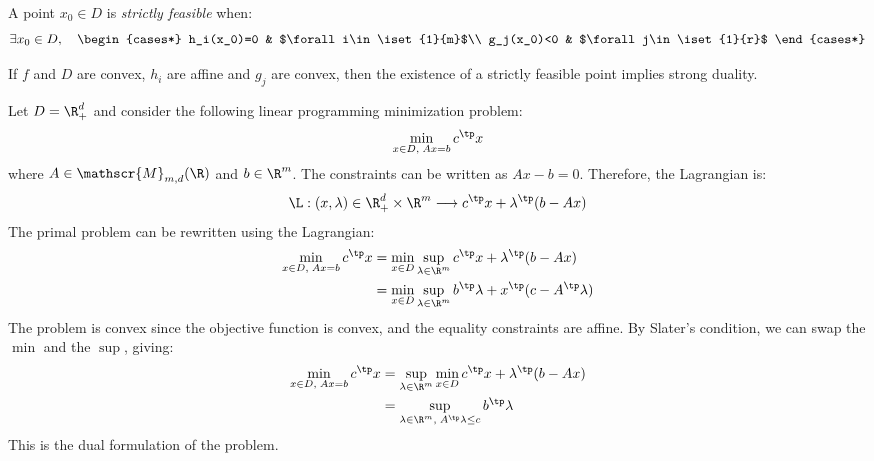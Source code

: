 \documentclass{../cs-classes/cs-classes}
\begin{document}
\begin{definition}
    A point $x_0\in D$ is \emph{strictly feasible} when:
    \begin{equation*}
        \exists x_0\in D, \quad \begin{cases*}
            h_i(x_0)=0 & $\forall i\in\iset{1}{m}$\\
            g_j(x_0)<0 & $\forall j\in\iset{1}{r}$
        \end{cases*}
    \end{equation*}
\end{definition}

\begin{theorem}
    If $f$ and $D$ are convex, $h_i$ are affine and $g_j$ are convex, then the existence of a strictly feasible point implies strong duality.
\end{theorem}

\begin{example}
    Let $D=\R^d_+$ and consider the following linear programming minimization problem:
    \begin{equation*}
        \min_{x\in D, \; Ax=b}c^\tp x
    \end{equation*}
    where $A\in\mathscr{M}_{m, d}(\R)$ and $b\in\R^m$. The constraints can be written as $Ax-b=0$. Therefore, the Lagrangian is:
    \begin{equation*}
        \L : (x, \lambda) \in \R_+^d \times \R^m \longrightarrow c^\tp x + \lambda^\tp(b-Ax)
    \end{equation*}
    The primal problem can be rewritten using the Lagrangian:
    \begin{equation*}
        \begin{aligned}
            \min_{x\in D, \; Ax=b}c^\tp x &= \min_{x\in D}\sup_{\lambda\in\R^m} c^\tp x+\lambda^\tp(b-Ax)\\
            &= \min_{x\in D}\sup_{\lambda\in\R^m} b^\tp\lambda+x^\tp(c-A^\tp\lambda)
        \end{aligned}
    \end{equation*}
    The problem is convex since the objective function is convex, and the equality constraints are affine. By Slater's condition, we can swap the $\min$ and the $\sup$, giving:
    \begin{equation*}
        \begin{aligned}
            \min_{x\in D, \; Ax=b}c^\tp x &= \sup_{\lambda\in\R^m} \min_{x\in D} c^\tp x+\lambda^\tp(b-Ax)\\
            &= \sup_{\lambda\in\R^m, \; A^\tp\lambda\leq c} b^\tp\lambda
        \end{aligned}
    \end{equation*}
    This is the dual formulation of the problem.
\end{example}
\end{document}
